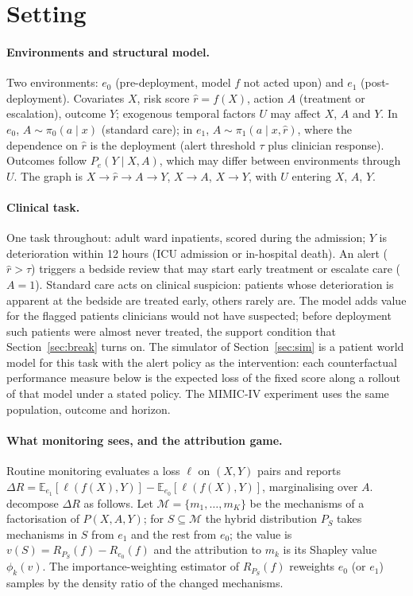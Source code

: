 \documentclass[letterpaper]{article} %
\newcommand{\E}{\mathbb{E}}
\newcommand{\rhat}{\hat r}
\begin{document}
\section{Setting}
\label{sec:setting}

\paragraph{Environments and structural model.} Two environments: $e_0$
(pre-deployment, model $f$ not acted upon) and $e_1$ (post-deployment).
Covariates $X$, risk score $\rhat = f(X)$, action $A$ (treatment or
escalation), outcome $Y$; exogenous temporal factors $U$ may affect $X$, $A$
and $Y$. In $e_0$, $A \sim \pi_0(a \mid x)$ (standard care); in $e_1$,
$A \sim \pi_1(a \mid x, \rhat)$, where the dependence on $\rhat$ is the
deployment (alert threshold $\tau$ plus clinician response). Outcomes follow
$P_e(Y \mid X, A)$, which may differ between environments through $U$. The
graph is $X \to \rhat \to A \to Y$, $X \to A$, $X \to Y$, with $U$ entering
$X$, $A$, $Y$.

\paragraph{Clinical task.} One task throughout: adult ward inpatients, scored
during the admission; $Y$ is deterioration within 12 hours (ICU admission or
in-hospital death). An alert ($\rhat > \tau$) triggers a bedside review that
may start early treatment or escalate care ($A = 1$). Standard care acts on
clinical suspicion: patients whose deterioration is apparent at the bedside
are treated early, others rarely are. The model adds value for the flagged
patients clinicians would not have suspected; before deployment such patients
were almost never treated, the support condition that Section~\ref{sec:break}
turns on. The simulator of Section~\ref{sec:sim} is a patient world model for this
task with the alert policy as the intervention: each counterfactual
performance measure below is the expected loss of the fixed score along a
rollout of that model under a stated policy. The MIMIC-IV experiment uses the
same population, outcome and horizon.

\paragraph{What monitoring sees, and the attribution game.} Routine
monitoring evaluates a loss $\ell$ on $(X, Y)$ pairs and reports
$\Delta R = \E_{e_1}[\ell(f(X), Y)] - \E_{e_0}[\ell(f(X), Y)]$, marginalising
over $A$. \citet{zhang2023attributing} decompose $\Delta R$ as follows. Let
$\mathcal{M} = \{m_1, \ldots, m_K\}$ be the mechanisms of a factorisation of
$P(X, A, Y)$; for $S \subseteq \mathcal{M}$ the hybrid distribution $P_S$
takes mechanisms in $S$ from $e_1$ and the rest from $e_0$; the value is
$v(S) = R_{P_S}(f) - R_{e_0}(f)$ and the attribution to $m_k$ is its Shapley
value $\phi_k(v)$. The importance-weighting estimator of $R_{P_S}(f)$
reweights $e_0$ (or $e_1$) samples by the density ratio of the changed
mechanisms.
\end{document}
